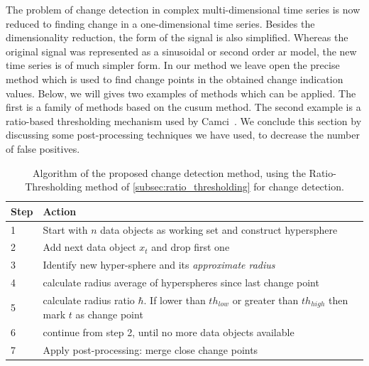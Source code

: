 The problem of change detection in complex multi-dimensional time series is now reduced to finding change in a one-dimensional time series.
Besides the dimensionality reduction, the form of the signal is also simplified.
Whereas the original signal was represented as a sinusoidal or second order \gls{ar} model, the new time series is of much simpler form.
In our method we leave open the precise method which is used to find change points in the obtained change indication values.
Below, we will gives two examples of methods which can be applied.
The first is a family of methods based on the \gls{cusum} method.
The second example is a ratio-based thresholding mechanism used by Camci~\cite{camci2010change}.
We conclude this section by discussing some post-processing techniques we have used, to decrease the number of false positives.

\begin{center}\begin{table}
  \begin{tabular}{ l p{12cm} }
    \hline
    Step & Action \\
    \hline
    1 & Start with $n$ data objects as working set and construct hypersphere \\
    2 & Add next data object $x_t$ and drop first one \\
    3 & Identify new hyper-sphere and its \emph{approximate radius} \\
    4 & calculate radius average of hyperspheres since last change point \\
    5 & calculate radius ratio $\hbar$. If lower than ${th}_{low}$ or greater than ${th}_{high}$ then mark $t$ as change point \\
    6 & continue from step 2, until no more data objects available \\
    7 & Apply post-processing: merge close change points \\
    \hline
  \end{tabular}
  \caption[Proposed algorithm]{Algorithm of the proposed change detection method, using the Ratio-Thresholding method of \ref{subsec:ratio_thresholding} for change detection.}
  \label{tab:algorithm_proposed_method}
\end{table}\end{center}

